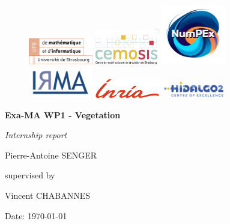\documentclass[12pt]{article}
\begin{document}
\begin{titlepage}
\centering

\begin{figure}[h]
    \centering
    \includegraphics[width=0.25\textwidth]{images/logo-ufr.png} \hspace{1cm}
    \includegraphics[width=0.25\textwidth]{images/logo-cemosis.png} \hspace{1cm}
    \includegraphics[width=0.25\textwidth]{images/logo-numpex.png} \\
    \vspace{1cm} %
    \includegraphics[width=0.25\textwidth]{images/logo-irma.png} \hspace{1cm}
    \includegraphics[width=0.25\textwidth]{images/logo-inria.png} \hspace{1cm}
    \includegraphics[width=0.25\textwidth]{images/logo-hidalgo2.png} \\
\end{figure}

\vspace{2cm}
{\huge\bfseries Exa-MA WP1 - Vegetation\par}
\vspace{1cm}
{\Large\itshape Internship report\par}
{\Large Pierre-Antoine SENGER\par}
\vspace{1cm}
supervised by\par
Vincent CHABANNES\par

\vfill

{\large Date: \today\par}
\end{titlepage}
\end{document}
